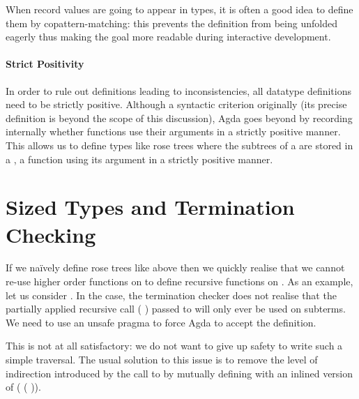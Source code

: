 
When record values are going to appear in types, it is often a good idea to define
them by copattern-matching: this prevents the definition from being unfolded eagerly
thus making the goal more readable during interactive development.

\paragraph{Strict Positivity} In order to rule out definitions leading to
inconsistencies, all datatype definitions need to be strictly positive.
Although a syntactic criterion originally (its precise definition is beyond
the scope of this discussion), Agda goes beyond by recording internally
whether functions use their arguments in a strictly positive manner.
This allows us to define types like rose trees where the subtrees of a
 are stored in a , a function using its 
argument in a strictly positive manner.


\section{Sized Types and Termination Checking}
\label{sec:sizetermination}

If we naïvely define rose trees like above then we quickly realise that we cannot
re-use higher order functions on  to define recursive functions on .
As an example, let us consider . In the  case,
the termination checker does not realise that the partially applied recursive call
( ) passed to 
will only ever be used on subterms. We need to use an unsafe  pragma
to force Agda to accept the definition.


This is not at all satisfactory: we do not want to give up safety to write such a
simple traversal. The usual solution to this issue is to remove the level of
indirection introduced by the call to  by mutually
defining with  an inlined version of
( ( )).

